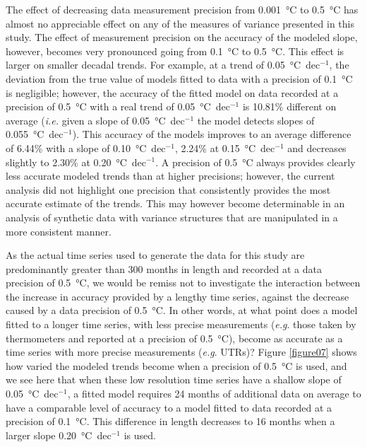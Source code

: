 \documentclass[]{ametsoc}
\begin{document}
The effect of decreasing data measurement precision from \SI{0.001}{\degreeCelsius} to \SI{0.5}{\degreeCelsius} has almost no appreciable effect on any of the measures of variance presented in this study. The effect of measurement precision on the accuracy of the modeled slope, however, becomes very pronounced going from \SI{0.1}{\degreeCelsius} to \SI{0.5}{\degreeCelsius}. This effect is larger on smaller decadal trends. For example, at a trend of \SI{0.05}{\degreeCelsius}~dec$^{-1}$, the deviation from the true value of models fitted to data with a precision of \SI{0.1}{\degreeCelsius} is negligible; however, the accuracy of the fitted model on data recorded at a precision of \SI{0.5}{\degreeCelsius} with a real trend of \SI{0.05}{\degreeCelsius}~dec$^{-1}$ is 10.81\% different on average (\emph{i.e.} given a slope of \SI{0.05}{\degreeCelsius}~dec$^{-1}$ the model detects slopes of \SI{0.055}{\degreeCelsius}~dec$^{-1}$). This accuracy of the models improves to an average difference of 6.44\% with a slope of \SI{0.10}{\degreeCelsius}~dec$^{-1}$, 2.24\% at \SI{0.15}{\degreeCelsius}~dec$^{-1}$ and decreases slightly to 2.30\% at \SI{0.20}{\degreeCelsius}~dec$^{-1}$. A precision of \SI{0.5}{\degreeCelsius} always provides clearly less accurate modeled trends than at higher precisions; however, the current analysis did not highlight one precision that consistently provides the most accurate estimate of the trends. This may however become determinable in an analysis of synthetic data with variance structures that are manipulated in a more consistent manner.

As the actual time series used to generate the data for this study are predominantly greater than 300 months in length and recorded at a data precision of \SI{0.5}{\degreeCelsius}, we would be remiss not to investigate the interaction between the increase in accuracy provided by a lengthy time series, against the decrease caused by a data precision of \SI{0.5}{\degreeCelsius}. In other words, at what point does a model fitted to a longer time series, with less precise measurements (\emph{e.g}. those taken by thermometers and reported at a precision of \SI{0.5}{\degreeCelsius}), become as accurate as a time series with more precise measurements (\emph{e.g}. UTRs)? Figure \ref{figure07} shows how varied the modeled trends become when a precision of \SI{0.5}{\degreeCelsius} is used, and we see here that when these low resolution time series have a shallow slope of \SI{0.05}{\degreeCelsius}~dec$^{-1}$, a fitted model requires 24 months of additional data on average to have a comparable level of accuracy to a model fitted to data recorded at a precision of \SI{0.1}{\degreeCelsius}. This difference in length decreases to 16 months when a larger slope \SI{0.20}{\degreeCelsius}~dec$^{-1}$ is used.
\end{document}
